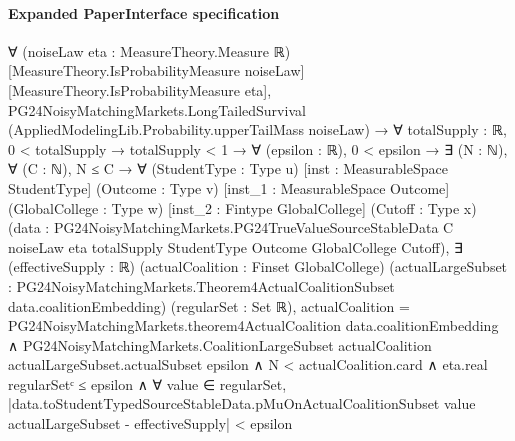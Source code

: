 \documentclass[10pt]{article}
\begin{document}
\paragraph{Expanded PaperInterface specification}
\begin{ReviewVerbatim}
∀ (noiseLaw eta : MeasureTheory.Measure ℝ) [MeasureTheory.IsProbabilityMeasure noiseLaw]
  [MeasureTheory.IsProbabilityMeasure eta],
  PG24NoisyMatchingMarkets.LongTailedSurvival (AppliedModelingLib.Probability.upperTailMass noiseLaw) →
    ∀ {totalSupply : ℝ},
      0 < totalSupply →
        totalSupply < 1 →
          ∀ (epsilon : ℝ),
            0 < epsilon →
              ∃ (N : ℕ),
                ∀ (C : ℕ),
                  N ≤ C →
                    ∀ (StudentType : Type u) [inst : MeasurableSpace StudentType] (Outcome : Type v)
                      [inst_1 : MeasurableSpace Outcome] (GlobalCollege : Type w) [inst_2 : Fintype GlobalCollege]
                      (Cutoff : Type x)
                      (data :
                        PG24NoisyMatchingMarkets.PG24TrueValueSourceStableData C noiseLaw eta totalSupply StudentType
                          Outcome GlobalCollege Cutoff),
                      ∃ (effectiveSupply : ℝ) (actualCoalition : Finset GlobalCollege) (actualLargeSubset :
                        PG24NoisyMatchingMarkets.Theorem4ActualCoalitionSubset data.coalitionEmbedding) (regularSet :
                        Set ℝ),
                        actualCoalition = PG24NoisyMatchingMarkets.theorem4ActualCoalition data.coalitionEmbedding ∧
                          PG24NoisyMatchingMarkets.CoalitionLargeSubset actualCoalition actualLargeSubset.actualSubset
                              epsilon ∧
                            N < actualCoalition.card ∧
                              eta.real regularSetᶜ ≤ epsilon ∧
                                ∀ value ∈ regularSet,
                                  |data.toStudentTypedSourceStableData.pMuOnActualCoalitionSubset value
                                          actualLargeSubset -
                                        effectiveSupply| <
                                    epsilon
\end{ReviewVerbatim}
\end{document}
